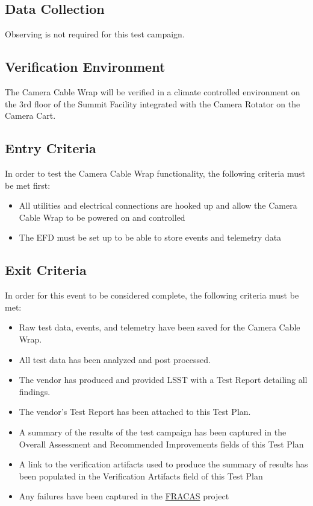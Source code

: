 \documentclass[SE,lsstdraft,STR,toc]{lsstdoc}
\providecommand{\tightlist}{
  \setlength{\itemsep}{0pt}\setlength{\parskip}{0pt}}
\begin{document}
\subsection{Data Collection}

  Observing is not required for this test campaign.

\subsection{Verification Environment}
\label{sect:hwconf}
   The Camera Cable Wrap will be verified in a climate controlled
environment on the 3rd floor of the Summit Facility integrated with the
Camera Rotator on the Camera Cart.


  \subsection{Entry Criteria}
   In order to test the Camera Cable Wrap functionality, the following
criteria must be met first:

\begin{itemize}
\tightlist
\item
  All utilities and electrical connections are hooked up and allow the
  Camera Cable Wrap to be powered on and controlled
\item
  The EFD must be set up to be able to store events and telemetry data
\end{itemize}


  \subsection{Exit Criteria}
   In order for this event to be considered complete, the following
criteria must be met:

\begin{itemize}
\tightlist
\item
  Raw test data, events, and telemetry have been saved for the Camera
  Cable Wrap.
\item
  All test data has been analyzed and post processed.
\item
  The vendor has produced and provided LSST with a Test Report detailing
  all findings.
\item
  The vendor's Test Report has been attached to this Test Plan.
\item
  A summary of the results of the test campaign has been captured in the
  Overall Assessment and Recommended Improvements fields of this Test
  Plan
\item
  A link to the verification artifacts used to produce the summary of
  results has been populated in the Verification Artifacts field of this
  Test Plan
\item
  Any failures have been captured in the
  \href{https://jira.lsstcorp.org/projects/FRACAS/issues/}{FRACAS}
  project
\end{itemize}
\end{document}
